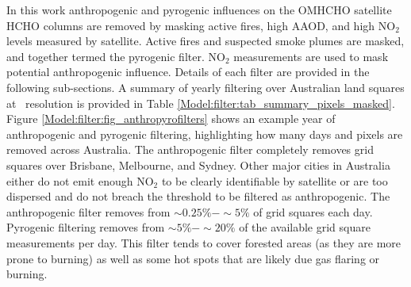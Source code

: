   
  In this work anthropogenic and pyrogenic influences on the OMHCHO satellite HCHO columns are removed by masking active fires, high AAOD, and high NO$_2$ levels measured by satellite.
  Active fires and suspected smoke plumes are masked, and together termed the pyrogenic filter.
  NO$_2$ measurements are used to mask potential anthropogenic influence.  
  Details of each filter are provided in the following sub-sections.
  A summary of yearly filtering over Australian land squares at \highhr ~resolution is provided in Table \ref{Model:filter:tab_summary_pixels_masked}.
  Figure \ref{Model:filter:fig_anthropyrofilters} shows an example year of anthropogenic and pyrogenic filtering, highlighting how many days and pixels are removed across Australia.
  The anthropogenic filter completely removes grid squares over Brisbane, Melbourne, and Sydney. 
  Other major cities in Australia either do not emit enough NO$_2$ to be clearly identifiable by satellite or are too dispersed and do not breach the threshold to be filtered as anthropogenic.
  The anthropogenic filter removes from $\sim 0.25\% - \sim5\%$ of grid squares each day.
  Pyrogenic filtering removes from $\sim 5\% - \sim 20\%$ of the available grid square measurements per day.
  This filter tends to cover forested areas (as they are more prone to burning) as well as some hot spots that are likely due gas flaring or burning.
  
